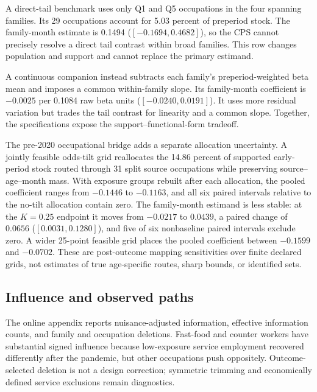 

A direct-tail benchmark uses only Q1 and Q5 occupations in the four spanning families.  Its 29 occupations account for 5.03 percent of preperiod stock.  The family-month estimate is 0.1494 ($[-0.1694,0.4682]$), so the CPS cannot precisely resolve a direct tail contrast within broad families.  This row changes population and support and cannot replace the primary estimand.

A continuous companion instead subtracts each family's preperiod-weighted beta mean and imposes a common within-family slope.  Its family-month coefficient is $-0.0025$ per 0.1084 raw beta units ($[-0.0240,0.0191]$).  It uses more residual variation but trades the tail contrast for linearity and a common slope.  Together, the specifications expose the support--functional-form tradeoff.

The pre-2020 occupational bridge adds a separate allocation uncertainty.  A
jointly feasible odds-tilt grid reallocates the 14.86 percent of supported
early-period stock routed through 31 split source occupations while preserving
source--age--month mass.  With exposure groups rebuilt after each allocation,
the pooled coefficient ranges from $-0.1446$ to $-0.1163$, and all six paired
intervals relative to the no-tilt allocation contain zero.  The family-month
estimand is less stable: at the $K=0.25$ endpoint it moves from $-0.0217$ to
$0.0439$, a paired change of $0.0656$ ($[0.0031,0.1280]$), and five of six
nonbaseline paired intervals exclude zero.  A wider 25-point feasible grid
places the pooled coefficient between $-0.1599$ and $-0.0702$.  These are
post-outcome mapping sensitivities over finite declared grids, not estimates of
true age-specific routes, sharp bounds, or identified sets.

\subsection{Influence and observed paths}

The online appendix reports nuisance-adjusted information, effective information counts, and family and occupation deletions.  Fast-food and counter workers have substantial signed influence because low-exposure service employment recovered differently after the pandemic, but other occupations push oppositely.  Outcome-selected deletion is not a design correction; symmetric trimming and economically defined service exclusions remain diagnostics.

